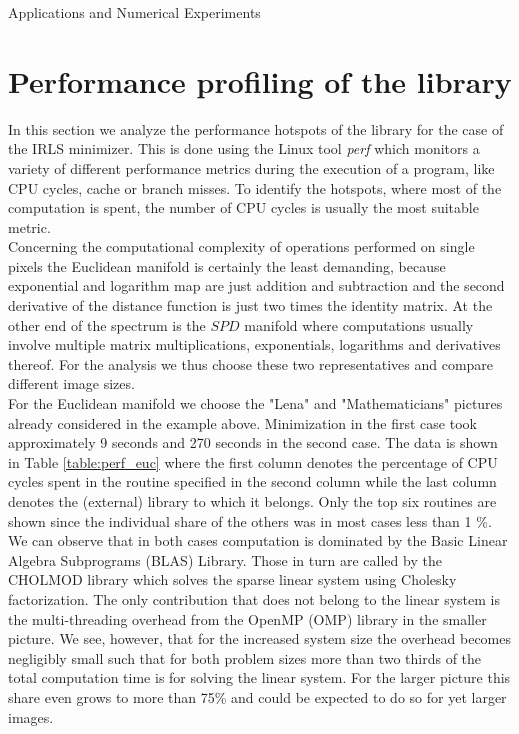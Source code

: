 \begin{chapter}{Applications and Numerical Experiments}
\FloatBarrier
\section{Performance profiling of the library} %
\label{sec:Performance profiling of the library}
In this section we analyze the performance hotspots of the library for the case of the IRLS minimizer. This is done using the Linux tool \emph{perf} which monitors a variety of different
performance metrics during the execution of a program, like CPU cycles, cache or branch misses. To identify the hotspots, where most of the computation is spent, the number of CPU cycles is
usually the most suitable metric.\\

Concerning the computational complexity of operations performed on single pixels the Euclidean manifold is certainly the least demanding, because exponential and logarithm map are just 
addition and subtraction and the second derivative of the distance function is just two times the identity matrix. At the other end of the spectrum is the $SPD$ manifold where
computations usually involve multiple matrix multiplications, exponentials, logarithms and derivatives thereof. For the analysis we thus choose these two representatives and compare
different image sizes.\\

For the Euclidean manifold we choose the "Lena" and "Mathematicians" pictures already considered in the example above. Minimization in the first case took approximately 9 seconds and 270 seconds in
the second case. The data is shown in Table \ref{table:perf_euc} where the first column denotes the percentage of CPU cycles spent in the routine specified in the second column 
while the last column denotes the (external) library to which it belongs. Only the top six routines are shown since the individual share of the others was in most cases less than 1 \%. \\

We can observe that in both cases computation is dominated by the Basic Linear Algebra Subprograms (BLAS) Library. Those in turn are called by the CHOLMOD library which solves the sparse
linear system using Cholesky factorization. The only contribution that does not belong to the linear system is the multi-threading overhead from the OpenMP (OMP) library in the smaller picture.
We see, however, that for the increased system size the overhead becomes negligibly small such that for both problem sizes more than two thirds of the total computation time is for solving the linear
system. For the larger picture this share even grows to more than 75\% and could be expected to do so for yet larger images.\\


\end{chapter}
